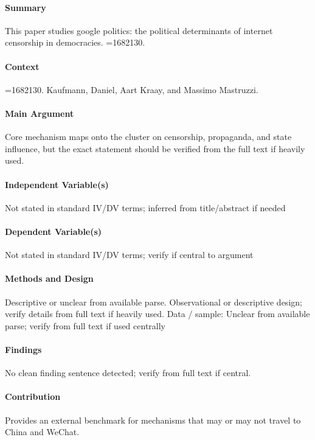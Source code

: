 \documentclass[12pt]{article}
\begin{document}
\paragraph{Summary} This paper studies google politics: the political determinants of internet censorship in democracies. =1682130.

\paragraph{Context} =1682130. Kaufmann, Daniel, Aart Kraay, and Massimo Mastruzzi.

\paragraph{Main Argument} Core mechanism maps onto the cluster on censorship, propaganda, and state influence, but the exact statement should be verified from the full text if heavily used.

\paragraph{Independent Variable(s)} Not stated in standard IV/DV terms; inferred from title/abstract if needed

\paragraph{Dependent Variable(s)} Not stated in standard IV/DV terms; verify if central to argument

\paragraph{Methods and Design} Descriptive or unclear from available parse. Observational or descriptive design; verify details from full text if heavily used. Data / sample: Unclear from available parse; verify from full text if used centrally

\paragraph{Findings} No clean finding sentence detected; verify from full text if central.

\paragraph{Contribution} Provides an external benchmark for mechanisms that may or may not travel to China and WeChat.
\end{document}
